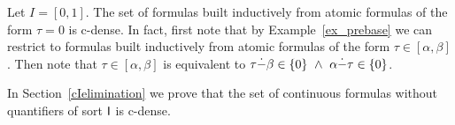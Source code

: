 \documentclass{amsproc}
\def\dotminus{\stackon[.2ex]{$-$}{$.$}}
\begin{document}
\begin{example}
  Let $I=[0,1]$.
  The set of formulas built inductively from atomic formulas of the form $\tau=0$ is c-dense.
  In fact, first note that by Example~\ref{ex_prebase} we can restrict to formulas built inductively from atomic formulas of the form $\tau\in[\alpha,\beta]$.
  Then note that $\tau\in[\alpha,\beta]$ is equivalent to $\tau\dotminus\beta\in\{0\}\ \wedge\ \alpha\dotminus\tau\in\{0\}$.
\end{example}


In Section~\ref{cIelimination} we prove that the set of continuous formulas without quantifiers of sort ${\sf I}$ is c-dense.
 


\end{document}
